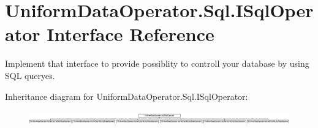 \hypertarget{interface_uniform_data_operator_1_1_sql_1_1_i_sql_operator}{}\section{Uniform\+Data\+Operator.\+Sql.\+I\+Sql\+Operator Interface Reference}
\label{interface_uniform_data_operator_1_1_sql_1_1_i_sql_operator}


Implement that interface to provide possiblity to controll your database by using S\+QL queryes.  


Inheritance diagram for Uniform\+Data\+Operator.\+Sql.\+I\+Sql\+Operator\+:\begin{figure}[H]
\begin{center}
\leavevmode
\includegraphics[height=0.590717cm]{d1/dad/interface_uniform_data_operator_1_1_sql_1_1_i_sql_operator}
\end{center}
\end{figure}
